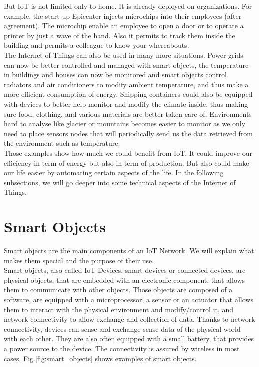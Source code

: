 But IoT is not limited only to home. It is already deployed on organizations. For example, the start-up Epicenter injects microchips into their employees (after agreement)\cite{website:lat_04_17}. The microchip enable an employee to open a door or to operate a printer by just a wave of the hand. Also it permits to track them inside the building and permits a colleague to know your whereabouts. \\

The Internet of Things can also be used in many more situations. Power grids can now be better controlled and managed with smart objects, the temperature in buildings and houses can now be monitored and smart objects control radiators and air conditioners to modify ambient temperature, and thus make a more efficient consumption of energy. Shipping containers could also be equipped with devices to better help monitor and modify the climate inside, thus making sure food, clothing, and various materials are better taken care of. Environments hard to analyse like glacier or mountains becomes easier to monitor as we only need to place sensors nodes that will periodically send us the data retrieved from the environment such as temperature. \\

Those examples show how much we could benefit from IoT. It could improve our efficiency in term of energy but also in term of production. But also could make our life easier by automating certain aspects of the life. In the following subsections, we will go deeper into some technical aspects of the Internet of Things. \\

\section{Smart Objects}

Smart objects are the main components of an IoT Network. We will explain what makes them special and the purpose of their use.\\

Smart objects, also called IoT Devices, smart devices or connected devices, are physical objects, that are embedded with an electronic component, that allows them to communicate with other objects. Those objects are composed of a software, are equipped with a microprocessor, a sensor or an actuator that allows them to interact with the physical environment and modify/control it, and network connectivity to allow exchange and collection of data. Thanks to network connectivity, devices can sense and exchange sense data of the physical world with each other. They are also often equipped with a small battery, that provides a power source to the device. The connectivity is assured by wireless in most cases. Fig.\ref{fig:smart_objects} shows examples of smart objects.\\

